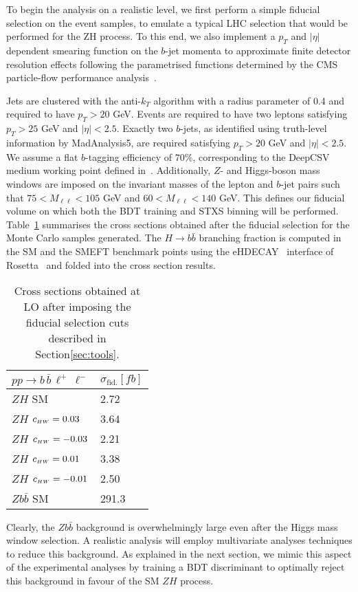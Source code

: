 To begin the analysis on a realistic level, we first perform a simple fiducial selection on the event samples, to emulate a typical LHC selection that would be performed for the ZH process. To this end, we also implement a $p_T$ and $|\eta|$ dependent smearing function on the $b$-jet momenta to approximate finite detector resolution effects following the parametrised functions determined by the CMS particle-flow performance analysis~\cite{Sirunyan:2017ulk}.

Jets are clustered with the anti-$k_T$ algorithm with a radius parameter of 0.4 and required to have $p_T > 20$ GeV. Events are required to have two leptons satisfying $p_T > 25$ GeV and $|\eta|< 2.5$. Exactly two $b$-jets, as identified using truth-level information by {\sc MadAnalysis5}, are required satisfying $p_T > 20$ GeV and $|\eta|< 2.5$. We assume a flat $b$-tagging efficiency of $70\%$, corresponding to the DeepCSV medium working point defined in~\cite{Sirunyan:2017ezt}. Additionally, $Z$- and Higgs-boson mass windows are imposed on the invariant masses of the lepton and $b$-jet pairs such that $75 < M_{\ell\ell} < 105$ GeV and  $60 < M_{\ell\ell} < 140$ GeV. This defines our fiducial volume on which both the BDT training and STXS binning will be performed. Table~\ref{tab:FiducialXS} summarises the cross sections obtained after the fiducial selection for the Monte Carlo samples generated. The $H\to b\bar{b}$ branching fraction is computed in the SM and the SMEFT benchmark points using the e{\sc HDECAY}~\cite{Contino:2014aaa} interface of {\sc Rosetta}~\cite{Falkowski:2015wza} and folded into the cross section results.
%
\begin{table}[h!]
    \centering
    \begin{tabular}{|l|l|}
        \hline
        $pp\to b\,\bar{b}\,\ell^+\,\ell^-$& $\sigma_{\text{fid.}} [fb]$\tabularnewline
        \hline
        $ZH$ SM&2.72\tabularnewline
        $ZH$ $c_{\scriptscriptstyle HW} = 0.03$&3.64\tabularnewline
        $ZH$ $c_{\scriptscriptstyle HW} = -0.03$&2.21\tabularnewline
        $ZH$ $c_{\scriptscriptstyle HW} = 0.01$&3.38\tabularnewline
        $ZH$ $c_{\scriptscriptstyle HW} = -0.01$&2.50\tabularnewline
        $Z b\bar{b}$ SM&291.3\tabularnewline
        \hline
    \end{tabular}
    \caption{\label{tab:FiducialXS} Cross sections obtained at LO after imposing the fiducial selection cuts described in Section\ref{sec:tools}.}
\end{table}
Clearly, the $Z b\bar{b}$ background is overwhelmingly large even after the Higgs mass
window selection. A realistic analysis will employ multivariate analyses techniques to
reduce this background. As explained in the next section, we mimic this aspect of the
experimental analyses by training a BDT discriminant to optimally reject this background
in favour of the SM $ZH$ process.

